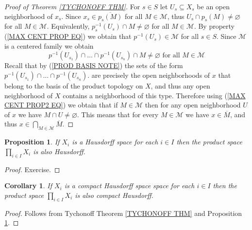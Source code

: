 \documentclass[11pt, letterpaper, oneside]{report}
\theoremstyle{pplain}
\newtheorem{proposition}[theorem]{Proposition}
\newtheorem{corollary}[theorem]{Corollary}
\newtheorem{ITERMVALUE THM}[theorem]{Intermediate Value Theorem}
\newtheorem{HEINEBOREL THM}[theorem]{Heine-Borel Theorem}
\newtheorem{UMETR THM}[theorem]{Urysohn Metrization Theorem}
\newtheorem{UMETR2 THM}[theorem]{Urysohn Metrization Theorem (v.2)}
\theoremstyle{ddefinition}
\theoremstyle{nnn}
\newtheorem{TDA NN}[theorem]{Topological Data Analysis. }
\theoremstyle{eexercise}
\newcommand{\MM}{{\mathcal M}}
\begin{document}
\begin{proof}[Proof of Theorem \ref{TYCHONOFF THM}]
For $s\in S$ let $U_{s}\subseteq X_{s}$ be an open neighborhood of $x_{s}$. Since
$x_{s}\in \overline{p_{s}(M)}$ for all $M\in \MM$, thus $U_{s}\cap p_{s}(M)\neq \varnothing$ for all $M\in \MM$.
Equivalently,  $p_{s}^{-1}(U_{s})\cap M \neq \varnothing $ for all $M\in \MM$. 
By property (\ref{MAX CENT PROP EQ})
we obtain that $p^{-1}(U_{s})\in \MM$ for all $s\in S$. Since $\MM$ is a centered family we obtain 
\begin{equation*}
\label{MAX CENT PROP2 EQ}
p^{-1}(U_{s_{1}})\cap \dots \cap p^{-1}(U_{s_{n}}) \cap M \neq \varnothing \text{\ \  for all } M\in \MM
\tag{$\ast\ast$}
\end{equation*}
Recall that by (\ref{PROD BASIS NOTE}) 
the sets of the form $p^{-1}(U_{s_{1}})\cap \dots \cap p^{-1}(U_{s_{n}})$. are precisely the open 
neighborhoods of $x$ that belong to the basis of the product topology on $X$, and thus 
any open neighborhood of $X$ contains a neighborhood of this type. Therefore 
using (\ref{MAX CENT PROP2 EQ}) we obtain that if $M\in \MM$ then for any open neighborhood 
$U$ of $x$ we have $M\cap U \neq \varnothing$. This means that for every $M\in \MM$ we have 
$x\in \overline{M}$, and thus $x\in \bigcap_{M\in \MM} \overline{M}$. 
 




\end{proof}



\begin{proposition}
\label{PROD HAUSDORFF PROP}
If $X_{i}$ is a Hausdorff  space for  each $i\in I$ then the product space $\prod_{i\in I}X_{i}$ is also Hausdorff. 
\end{proposition}

\begin{proof}
Exercise.
\end{proof}

\begin{corollary}
\label{PROD HAUS COMP COR}
If  $X_{i}$ is a compact Hausdorff space space for  each $i\in I$ then the product 
space $\prod_{i\in I}X_{i}$ is also compact Hausdorff. 
\end{corollary}


\begin{proof}
Follows from Tychonoff Theorem \ref{TYCHONOFF THM} and Proposition \ref{PROD HAUSDORFF PROP}.
\end{proof}



\end{document}
